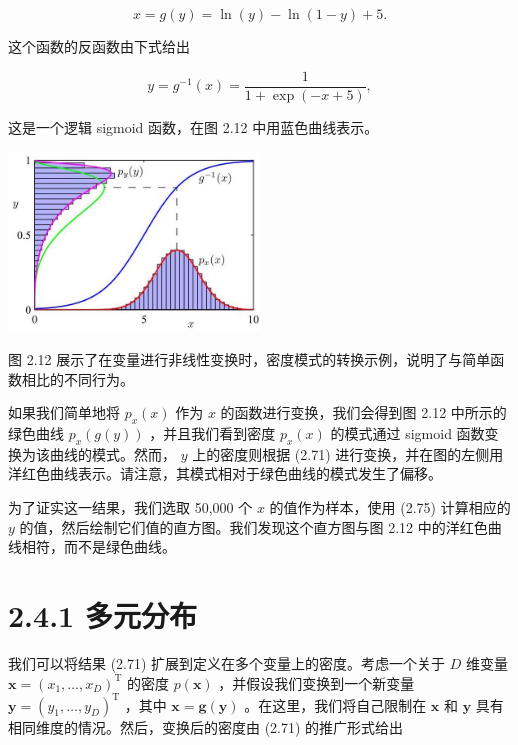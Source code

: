 \documentclass[10pt]{article}
\begin{document}
\[
x = g\left( y\right)  = \ln \left( y\right)  - \ln \left( {1 - y}\right)  + 5. \tag{2.74}
\]

这个函数的反函数由下式给出

\[
y = {g}^{-1}\left( x\right)  = \frac{1}{1 + \exp \left( {-x + 5}\right) }, \tag{2.75}
\]

这是一个逻辑 sigmoid 函数，在图 2.12 中用蓝色曲线表示。

\begin{center}
\includegraphics[max width=0.5\textwidth]{images/0194e279-9b28-703a-88f4-c3ac21e2010d_63_930_349_618_442_0.jpg}
\end{center}
\hspace*{3em} 

图 2.12 展示了在变量进行非线性变换时，密度模式的转换示例，说明了与简单函数相比的不同行为。

如果我们简单地将 \({p}_{x}\left( x\right)\) 作为 \(x\) 的函数进行变换，我们会得到图 2.12 中所示的绿色曲线 \({p}_{x}\left( {g\left( y\right) }\right)\) ，并且我们看到密度 \({p}_{x}\left( x\right)\) 的模式通过 sigmoid 函数变换为该曲线的模式。然而， \(y\) 上的密度则根据 (2.71) 进行变换，并在图的左侧用洋红色曲线表示。请注意，其模式相对于绿色曲线的模式发生了偏移。

为了证实这一结果，我们选取 50,000 个 \(x\) 的值作为样本，使用 (2.75) 计算相应的 \(y\) 的值，然后绘制它们值的直方图。我们发现这个直方图与图 2.12 中的洋红色曲线相符，而不是绿色曲线。

\section*{2.4.1 多元分布}

我们可以将结果 (2.71) 扩展到定义在多个变量上的密度。考虑一个关于 \(D\) 维变量 \(\mathbf{x} = {\left( {x}_{1},\ldots ,{x}_{D}\right) }^{\mathrm{T}}\) 的密度 \(p\left( \mathbf{x}\right)\) ，并假设我们变换到一个新变量 \(\mathbf{y} = {\left( {y}_{1},\ldots ,{y}_{D}\right) }^{\mathrm{T}}\) ，其中 \(\mathbf{x} = \mathbf{g}\left( \mathbf{y}\right)\) 。在这里，我们将自己限制在 \(\mathbf{x}\) 和 \(\mathbf{y}\) 具有相同维度的情况。然后，变换后的密度由 (2.71) 的推广形式给出
\end{document}
